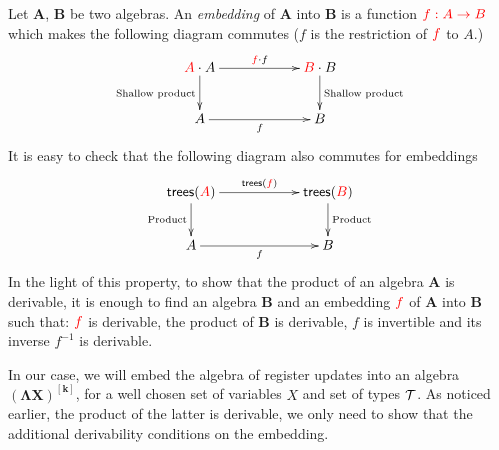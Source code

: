 Let $\mathbf{A}$, $\mathbf{B}$ be two algebras. An \emph{embedding} of $\mathbf{A}$ into $\mathbf{B}$ is a function ${\color{red}{f: {\color{red}{A}}\to {\color{red}{B}}}}$ which makes the following diagram commutes ($f$ is the restriction of ${\color{red}{f}}$ to $A$.)
      \begin{align*}
    \xymatrix@C=2cm{
        \ranked{A} \cdot A \ar[r]^{\ranked{f}\cdot f} \ar[d]_{\text{Shallow product}} & \ranked{B}\cdot B \ar[d]^{\text{Shallow product}}\\
A \ar[r]_{f} & B       
       }
    \end{align*} 
It is easy to check that the following diagram also commutes for embeddings    
        \begin{align*}
    \xymatrix@C=2cm{
        \trees(\ranked{A}) \ar[r]^{\trees(\ranked{f})} \ar[d]_{\text{Product}} & \trees(\ranked{B}) \ar[d]^{\text{Product}}\\
A \ar[r]_{f} & B       
       }
    \end{align*}  
 In the light of this property, to show that the product of an algebra $\mathbf{A}$ is derivable, it is enough to find an algebra $\mathbf{B}$ and an embedding ${\color{red}{f}}$ of $\mathbf{A}$ into $\mathbf{B}$ such that: ${\color{red}{f}}$ is derivable,  the product of $\mathbf{B}$ is derivable, $f$ is invertible and its inverse $f^{-1}$ is derivable.  

In our case, we will embed the algebra of register updates into an algebra $\mathbf{(\Lambda X)^{[k]}}$, for a well chosen set of variables $X$ and set of types ${\mathcal T}$. As noticed earlier, the product of the latter is derivable, we only need to show that the additional derivability conditions on the embedding.


